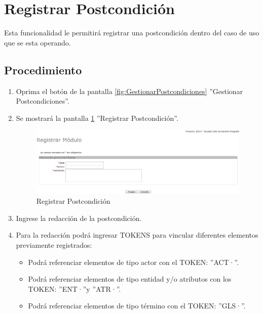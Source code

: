 
\hypertarget{cv:registrarPostcondicion}{\section{Registrar Postcondición}} \label{sec:registrarPostcondicion}

	Esta funcionalidad le permitirá registrar una postcondición dentro del caso de uso que se esta operando.

		\subsection{Procedimiento}

			\begin{enumerate}
	
			\item Oprima el botón \IURegistrar{} de la pantalla \ref{fig:GestionarPostcondiciones} ''Gestionar Postcondiciones''.
			
			\item Se mostrará la pantalla \ref{fig:registrarPostcondicion} ''Registrar Postcondición''.

			\begin{figure}[htbp!]
				\begin{center}
					\includegraphics[scale=0.5]{roles/lider/casosUso/pantallas/IU5-1registrarModulo}
					\caption{Registrar Postcondición}
					\label{fig:registrarPostcondicion}
				\end{center}
			\end{figure}
		
			\item Ingrese la redacción de la postcondición.
			
			\item Para la redacción podrá ingresar TOKENS para vincular diferentes elementos previamente registrados:
			
			\begin{itemize}
				\item Podrá referenciar elementos de tipo actor con el TOKEN: ''ACT·''.
				\item Podrá referenciar elementos de tipo entidad y/o atributos con los TOKEN: ''ENT·''y ''ATR·''.
				\item Podrá referenciar elementos de tipo término con el TOKEN: ''GLS·''.
			\end{itemize}
			

\end{enumerate}
